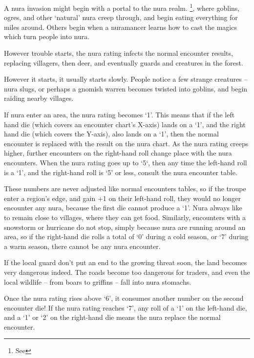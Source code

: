 \begin{multicols}{2}

\noindent
A nura invasion might begin with a portal to the nura realm.%
\footnote{See },
where goblins, ogres, and other `natural' nura creep through, and begin eating everything for miles around.
Others begin when a nuramancer learns how to cast the magics which turn people into nura.

However trouble starts, the nura rating infects the normal encounter results, replacing villagers, then deer, and eventually \glspl{guard} and creatures in the forest.

However it starts, it usually starts slowly.
People notice a few strange creatures -- nura slugs, or perhaps a gnomish warren becomes twisted into goblins, and begin raiding nearby villages.

If nura enter an area, the nura rating becomes `1'.
This means that if the left hand die (which covers an encounter chart's X-axis) lands on a `1', and the right hand die (which covers the Y-axis), also lands on a `1', then the normal encounter is replaced with the result on the nura chart.
As the nura rating creeps higher, further encounters on the right-hand roll change place with the nura encounters.
When the nura rating goes up to `5`, then any time the left-hand roll is a `1', and the right-hand roll is `5' or less, consult the nura encounter table.

These numbers are never adjusted like normal encounters tables, so if the troupe enter a region's \gls{edge}, and gain +1 on their left-hand roll, they would no longer encounter any nura, because the first die cannot produce a `1'.
Nura always like to remain close to villages, where they can get food.
Similarly, encounters with a snowstorm or hurricane do not stop, simply because nura are running around an area, so if the right-hand die rolls a total of `0' during a cold season, or `7' during a warm season, there cannot be any nura encounter.

If the local \gls{guard} don't put an end to the growing threat soon, the land becomes very dangerous indeed.
The roads become too dangerous for traders, and even the local wildlife -- from boars to griffins -- fall into nura stomachs.

Once the nura rating rises above `6', it consumes another number on the second encounter die!
If the nura rating reaches `7', any roll of a `1' on the left-hand die, and a `1' or `2' on the right-hand die means the nura replace the normal encounter.


\end{multicols}
